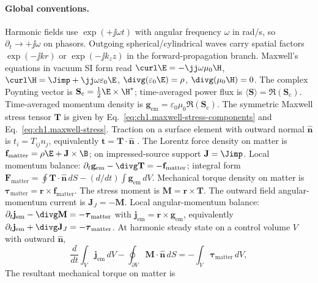 \paragraph{Global conventions.}
Harmonic fields use $\exp(+\jj\omega t)$ with angular frequency $\omega$ in rad/s, so $\partial_t\rightarrow +\jj\omega$ on phasors.
Outgoing spherical/cylindrical waves carry spatial factors $\exp(-\jj kr)$ or $\exp(-\jj k_z z)$ in the forward-propagation branch.
Maxwell's equations in vacuum SI form read
$\curl\E=-\jj\omega\mu_0\H$,
$\curl\H=\Jimp+\jj\omega\varepsilon_0\E$,
$\divg(\varepsilon_0\E)=\rho$,
$\divg(\mu_0\H)=0$.
The complex Poynting vector is $\mathbf{S}_\mathrm{c}=\tfrac12\E\times\H^*$;
time-averaged power flux is $\langle\mathbf{S}\rangle=\Re(\mathbf{S}_\mathrm{c})$.
Time-averaged momentum density is $\mathbf{g}_{\mathrm{em}}=\varepsilon_0\mu_0\Re(\mathbf{S}_\mathrm{c})$.
The symmetric Maxwell stress tensor $\mathbf{T}$ is given by Eq.~\eqref{eq:ch1.maxwell-stress-components} and Eq.~\eqref{eq:ch1.maxwell-stress}.
Traction on a surface element with outward normal $\hat{\mathbf{n}}$ is $t_i=T_{ij}n_j$, equivalently $\mathbf{t}=\mathbf{T}\cdot\hat{\mathbf{n}}$ \cite{stratton1941}.
The Lorentz force density on matter is $\mathbf{f}_{\mathrm{matter}}=\rho\E+\mathbf{J}\times\B$; on impressed-source support $\mathbf{J}=\Jimp$.
Local momentum balance: $\partial_t\mathbf{g}_{\mathrm{em}}-\divg\mathbf{T}=-\mathbf{f}_{\mathrm{matter}}$;
integral form $\mathbf{F}_{\mathrm{matter}}=\oint \mathbf{T}\cdot\hat{\mathbf{n}}\,dS-(d/dt)\int \mathbf{g}_{\mathrm{em}}\,dV$.
Mechanical torque density on matter is $\boldsymbol{\tau}_{\mathrm{matter}}=\mathbf{r}\times\mathbf{f}_{\mathrm{matter}}$.
The stress moment is $\mathbf{M}=\mathbf{r}\times\mathbf{T}$.
The outward field angular-momentum current is $\mathbf{J}_J=-\mathbf{M}$.
Local angular-momentum balance: $\partial_t\mathbf{j}_{\mathrm{em}}-\divg\mathbf{M}=-\boldsymbol{\tau}_{\mathrm{matter}}$ with $\mathbf{j}_{\mathrm{em}}=\mathbf{r}\times\mathbf{g}_{\mathrm{em}}$, equivalently $\partial_t\mathbf{j}_{\mathrm{em}}+\divg\mathbf{J}_J=-\boldsymbol{\tau}_{\mathrm{matter}}$.
At harmonic steady state on a control volume $V$ with outward $\hat{\mathbf{n}}$,
\begin{equation}
\label{eq:ch1.convention-am-balance}
\frac{d}{dt}\int_V \mathbf{j}_{\mathrm{em}}\,dV
-\oint_{\partial V}\mathbf{M}\cdot\hat{\mathbf{n}}\,dS
=-\int_V \boldsymbol{\tau}_{\mathrm{matter}}\,dV,
\end{equation}
The resultant mechanical torque on matter is

